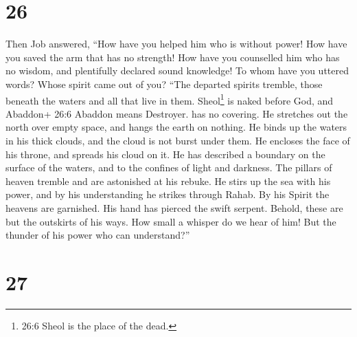 \hypertarget{section-19}{%
\section{26}\label{section-19}}

 Then Job answered,  ``How have you helped him
who is without power! How have you saved the arm that has no strength!
 How have you counselled him who has no wisdom, and
plentifully declared sound knowledge!  To whom have you
uttered words? Whose spirit came out of you?  ``The departed
spirits tremble, those beneath the waters and all that live in them.
 Sheol\footnote{26:6 Sheol is the place of the dead.} is
naked before God, and Abaddon+ 26:6 Abaddon means Destroyer. has no
covering.  He stretches out the north over empty space, and
hangs the earth on nothing.  He binds up the waters in his
thick clouds, and the cloud is not burst under them.  He
encloses the face of his throne, and spreads his cloud on it.
 He has described a boundary on the surface of the waters,
and to the confines of light and darkness.  The pillars of
heaven tremble and are astonished at his rebuke.  He stirs
up the sea with his power, and by his understanding he strikes through
Rahab.  By his Spirit the heavens are garnished. His hand
has pierced the swift serpent.  Behold, these are but the
outskirts of his ways. How small a whisper do we hear of him! But the
thunder of his power who can understand?''

\hypertarget{section-20}{%
\section{27}\label{section-20}}

